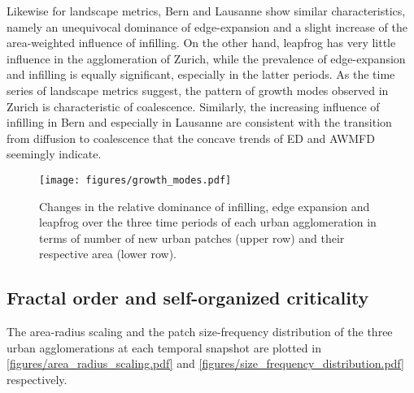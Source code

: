\documentclass[10pt,letterpaper]{article}
\begin{document}
Likewise for landscape metrics, Bern and Lausanne show similar characteristics, namely an unequivocal dominance of edge-expansion and a slight increase of the area-weighted influence of infilling.
On the other hand, leapfrog has very little influence in the agglomeration of Zurich, while the prevalence of edge-expansion and infilling is equally significant, especially in the latter periods.
As the time series of landscape metrics suggest, the pattern of growth modes observed in Zurich is characteristic of coalescence.
Similarly, the increasing influence of infilling in Bern and especially in Lausanne are consistent with the transition from diffusion to coalescence that the concave trends of ED and AWMFD seemingly indicate.

\begin{figure}[ht]
  \begin{adjustwidth}{-.4\textwidth}{0cm}
    \centering  
    \texttt{[image: figures/growth\_modes.pdf]}
    \vspace{.5em}
    \caption[Three growth modes]{\label{figures/growth_modes.pdf}Changes in the relative dominance of infilling, edge expansion and leapfrog over the three time periods of each urban agglomeration in terms of number of new urban patches (upper row) and their respective area (lower row).}
  \end{adjustwidth}
\end{figure}


\subsection*{Fractal order and self-organized criticality}

The area-radius scaling and the patch size-frequency distribution of the three urban agglomerations at each temporal snapshot are plotted in \autoref{figures/area_radius_scaling.pdf} and \autoref{figures/size_frequency_distribution.pdf} respectively.
\end{document}
